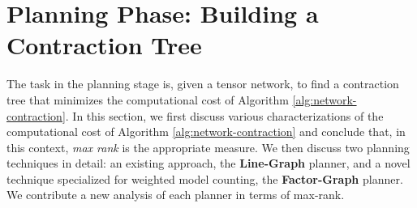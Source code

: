 \section{Planning Phase: Building a Contraction Tree}
\label{sec:tensors:planning}
The task in the planning stage is, given a tensor network, to find a contraction tree that minimizes the computational cost of Algorithm \ref{alg:network-contraction}.
In this section, we first discuss various characterizations of the computational cost of Algorithm \ref{alg:network-contraction} and conclude that, in this context, \emph{max rank} is the appropriate measure.
We then discuss two planning techniques in detail: an existing approach, the \textbf{Line-Graph} planner, and a novel technique specialized for weighted model counting, the \textbf{Factor-Graph} planner. We contribute a new analysis of each planner in terms of max-rank.






